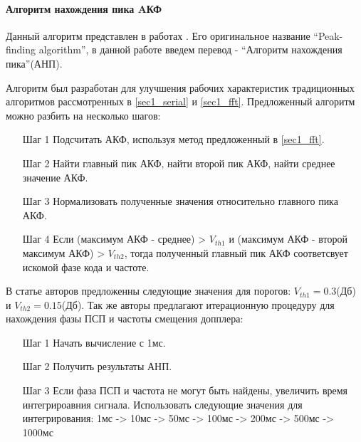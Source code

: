 \paragraph{Алгоритм нахождения пика AКФ}

Данный алгоритм представлен в работах \cite{2max_ieee, 2max_article}. Его оригинальное название
\textquotedblleft{Peak-finding algorithm}\textquotedblright,
в данной работе введем перевод -
\textquotedblleft{Алгоритм нахождения пика}\textquotedblright (АНП). 

Алгоритм был разработан для улучшения рабочих характеристик традиционных алгоритмов рассмотренных в
\ref{sec1_serial} и \ref{sec1_fft}. Предложенный алгоритм можно разбить на несколько шагов:
\begin{itemize}
\item[Шаг 1] Подсчитать АКФ, используя метод предложенный в \ref{sec1_fft}.
\item[Шаг 2] Найти главный пик АКФ, найти второй пик АКФ, найти среднее значение АКФ.
\item[Шаг 3] Нормализовать полученные значения относительно главного пика АКФ.
\item[Шаг 4] Если (максимум АКФ - среднее) > ${V_{th1}}$ и (максимум АКФ - 
	второй максимум АКФ) > ${V_{th2}}$, тогда полученный главный пик АКФ соответсвует
	искомой фазе кода и частоте.
\end{itemize}

В статье авторов \cite{2max_ieee} предложенны следующие значения для порогов:
${V_{th1}} = 0.3$(Дб) и  ${V_{th2}} = 0.15$(Дб). Так же авторы предлагают итерационную процедуру для нахождения
фазы ПСП и частоты смещения допплера:
\begin{itemize}
\item[Шаг 1] Начать вычисление с 1мс.
\item[Шаг 2] Получить результаты АНП.
\item[Шаг 3] Если фаза ПСП и частота не могут быть найдены, увеличить время интегрироавния сигнала.
	Использовать следующие значения для интегрирования: 1мс -> 10мс -> 50мс -> 100мс -> 200мс ->
	500мс -> 1000мс
\end{itemize}


\newpage
